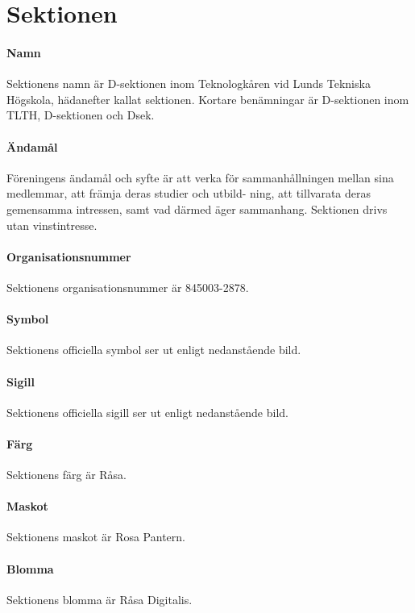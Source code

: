 \documentclass{dsekstatutes}
\begin{document}
\coverpage
\section{Sektionen}
\paragraph{Namn}
Sektionens namn är D-sektionen inom Teknologkåren vid Lunds Tekniska Högskola,
hädanefter kallat sektionen. Kortare benämningar är D-sektionen inom TLTH,
D-sektionen och Dsek.

\paragraph{Ändamål}
Föreningens ändamål och syfte är att verka för sammanhållningen mellan sina
medlemmar, att främja deras studier och utbild- ning, att tillvarata deras
gemensamma intressen, samt vad därmed äger sammanhang. Sektionen drivs utan
vinstintresse.

\paragraph{Organisationsnummer}
Sektionens organisationsnummer är 845003-2878.

\paragraph{Symbol}
Sektionens officiella symbol ser ut enligt nedanstående bild.

\Dsymbol[height=10mm]

\paragraph{Sigill}
Sektionens officiella sigill ser ut enligt nedanstående bild.

\Dseksigil[height=30mm, color]

\paragraph{Färg}
Sektionens färg är Råsa.

\paragraph{Maskot}
Sektionens maskot är Rosa Pantern.

\paragraph{Blomma}
Sektionens blomma är Råsa Digitalis.
\end{document}
